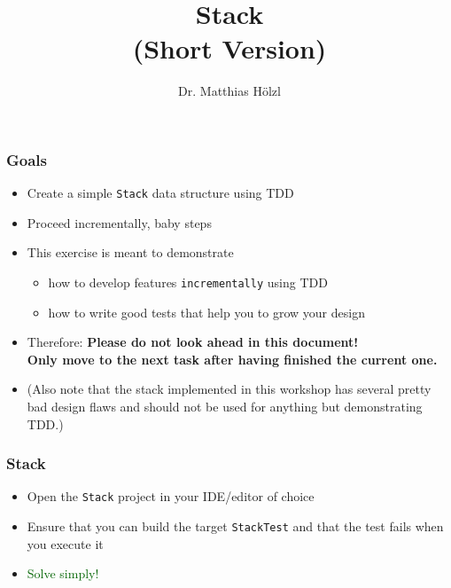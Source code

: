\documentclass[10pt,aspectratio=169]{beamer}
\author{Dr. Matthias Hölzl}
\begin{document}
\title[Stack]{%
  Stack\\
  (Short Version)}

\begin{frame}
  \maketitle
\end{frame}

\begin{frame}[fragile]
  \frametitle{Goals}
  \begin{itemize}
    \item Create a simple \texttt{Stack} data structure using TDD
    \item Proceed incrementally, baby steps\\[1ex]

    \item This exercise is meant to demonstrate
          \begin{itemize}
            \item how to develop features \texttt{incrementally} using TDD
            \item how to write good tests that help you to grow your design
          \end{itemize}
    \item Therefore: \textbf{Please do not look ahead in this document!\\
            Only move to the next task after having finished the current one.}
    \item (Also note that the stack implemented in this workshop has several
          pretty bad design flaws and should not be used for anything but
          demonstrating TDD.)
  \end{itemize}
\end{frame}


\begin{frame}[fragile]
  \frametitle{Stack}
  \begin{itemize}
    \item Open the \texttt{Stack} project in your IDE/editor of choice
    \item Ensure that you can build the target \texttt{StackTest} and
          that the test fails when you execute it
  \end{itemize}
  \bigskip
  \begin{itemize}
    \item \textcolor{darkgreen}{Solve simply!}
  \end{itemize}
\end{frame}
\end{document}
